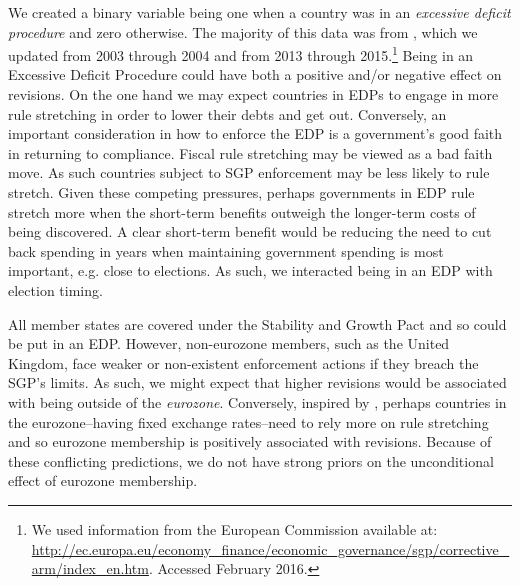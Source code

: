 \documentclass[]{article}
\begin{document}
We created a binary variable being one when a country was in an \emph{excessive deficit procedure} and zero otherwise. The majority of this data was from \cite{baergHallerberg2016}, which we updated from 2003 through 2004 and from 2013 through 2015.\footnote{We used information from the European Commission available at: \url{http://ec.europa.eu/economy_finance/economic_governance/sgp/corrective_arm/index_en.htm}. Accessed February 2016.}  Being in an Excessive Deficit Procedure could have both a positive and/or negative effect on revisions. On the one hand we may expect countries in EDPs to engage in more rule stretching in order to lower their debts and get out. Conversely, an important consideration in how to enforce the EDP is a government's good faith in returning to compliance. Fiscal rule stretching may be viewed as a bad faith move. As such countries subject to SGP enforcement may be less likely to rule stretch. Given these competing pressures, perhaps governments in EDP rule stretch more when the short-term benefits outweigh the longer-term costs of being discovered. A clear short-term benefit would be reducing the need to cut back spending in years when maintaining government spending is most important, e.g. close to elections. As such, we interacted being in an EDP with election timing.

All member states are covered under the Stability and Growth Pact and so could be put in an EDP. However, non-eurozone members, such as the United Kingdom, face weaker or non-existent enforcement actions if they breach the SGP's limits. As such, we might expect that higher revisions would be associated with being outside of the \emph{eurozone}. Conversely, inspired by \cite{clark2003}, perhaps countries in the eurozone--having fixed exchange rates--need to rely more on rule stretching and so eurozone membership is positively associated with revisions. Because of these conflicting predictions, we do not have strong priors on the unconditional effect of eurozone membership.
\end{document}
